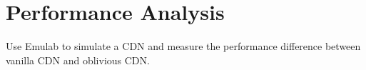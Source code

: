 \section{Performance Analysis}
\label{sec:performance}

Use Emulab to simulate a CDN and measure the performance difference between vanilla CDN and oblivious CDN.
